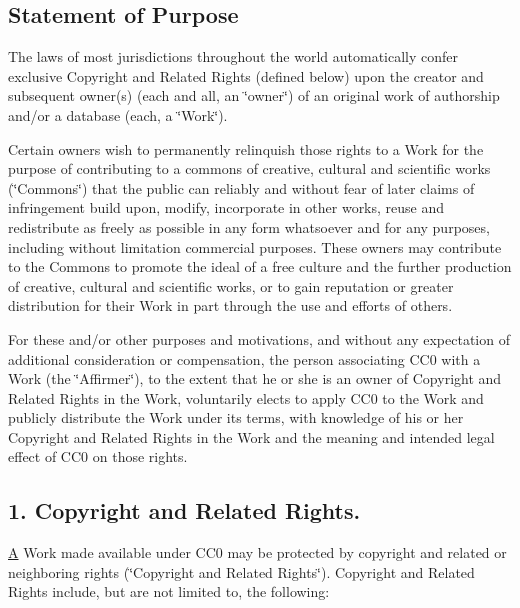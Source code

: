 \subsection*{Statement of Purpose }

The laws of most jurisdictions throughout the world automatically confer exclusive Copyright and Related Rights (defined below) upon the creator and subsequent owner(s) (each and all, an \char`\"{}owner\char`\"{}) of an original work of authorship and/or a database (each, a \char`\"{}\+Work\char`\"{}).

Certain owners wish to permanently relinquish those rights to a Work for the purpose of contributing to a commons of creative, cultural and scientific works (\char`\"{}\+Commons\char`\"{}) that the public can reliably and without fear of later claims of infringement build upon, modify, incorporate in other works, reuse and redistribute as freely as possible in any form whatsoever and for any purposes, including without limitation commercial purposes. These owners may contribute to the Commons to promote the ideal of a free culture and the further production of creative, cultural and scientific works, or to gain reputation or greater distribution for their Work in part through the use and efforts of others.

For these and/or other purposes and motivations, and without any expectation of additional consideration or compensation, the person associating C\+C0 with a Work (the \char`\"{}\+Affirmer\char`\"{}), to the extent that he or she is an owner of Copyright and Related Rights in the Work, voluntarily elects to apply C\+C0 to the Work and publicly distribute the Work under its terms, with knowledge of his or her Copyright and Related Rights in the Work and the meaning and intended legal effect of C\+C0 on those rights.

\subsection*{1. Copyright and Related Rights. }

\mbox{\hyperlink{struct_a}{A}} Work made available under C\+C0 may be protected by copyright and related or neighboring rights (\char`\"{}\+Copyright and Related Rights\char`\"{}). Copyright and Related Rights include, but are not limited to, the following\+:

